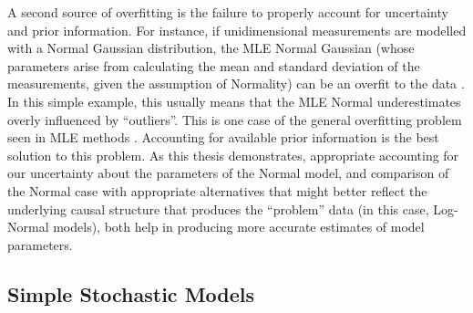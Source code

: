 \documentclass{ut-thesis}
\providecommand{\DIFaddtex}[1]{{\protect\color{blue}\uwave{#1}}} %
\providecommand{\DIFdeltex}[1]{{\protect\color{red}\sout{#1}}}                      %
\providecommand{\DIFaddbegin}{\global\advance\DIFcounterb 1\relax\zlabel{DIFchgb\the\DIFcounterb}} %
\providecommand{\DIFaddend}{\global\advance\DIFcountere 1\relax\zlabel{DIFchge\the\DIFcountere}} %
\providecommand{\DIFdelbegin}{\global\advance\DIFcounterb 1\relax\zlabel{DIFchgb\the\DIFcounterb}} %
\providecommand{\DIFdelend}{\global\advance\DIFcountere 1\relax\zlabel{DIFchge\the\DIFcountere}} %
\providecommand{\DIFaddFL}[1]{\DIFadd{#1}} %
\providecommand{\DIFdelFL}[1]{\DIFdel{#1}} %
\providecommand{\DIFaddbeginFL}{\DIFaddbegin} %
\providecommand{\DIFaddendFL}{\DIFaddend} %
\providecommand{\DIFdelbeginFL}{\DIFdelbegin} %
\providecommand{\DIFdelendFL}{\DIFdelend} %
\providecommand{\DIFadd}[1]{\texorpdfstring{\DIFaddtex{#1}}{#1}} %
\providecommand{\DIFdel}[1]{\texorpdfstring{\DIFdeltex{#1}}{}} %
\begin{document}
\begin{NoHyper}
A second source of overfitting is the failure to properly account for uncertainty and prior information. For instance, if unidimensional measurements are modelled with a Normal Gaussian distribution, the MLE Normal Gaussian (whose parameters arise from calculating the mean and standard deviation of the measurements, given the assumption of Normality) can be an overfit to the data \cite[p.28]{Bishop2006}. In this simple example, this usually means that the MLE Normal underestimates overly influenced by ``outliers''. This is one case of the general overfitting problem seen in MLE methods \cite{Green2017}. Accounting for available prior information is the best solution to this problem. As this thesis demonstrates, appropriate accounting for our uncertainty about the parameters of the Normal model, and comparison of the Normal case with appropriate alternatives that might better reflect the underlying causal structure that produces the ``problem'' data (in this case, Log-Normal models), both help in producing more accurate estimates of model parameters.

\subsection{Simple Stochastic Models}
\label{ssec:SSM}



\end{NoHyper}
\end{document}
